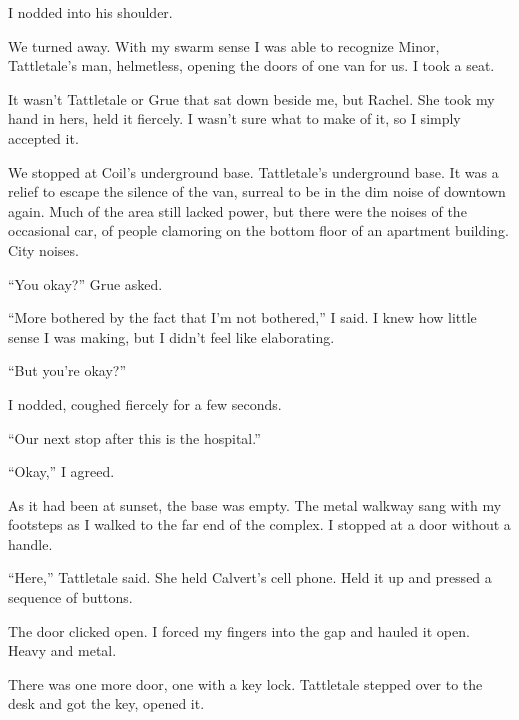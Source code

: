 I nodded into his shoulder.



We turned away.  With my swarm sense I was able to recognize Minor, Tattletale's man, helmetless, opening the doors of one van for us.  I took a seat.



It wasn't Tattletale or Grue that sat down beside me, but Rachel.  She took my hand in hers, held it fiercely.  I wasn't sure what to make of it, so I simply accepted it.



\blacksquare



We stopped at Coil's underground base.  Tattletale's underground base.  It was a relief to escape the silence of the van, surreal to be in the dim noise of downtown again.  Much of the area still lacked power, but there were the noises of the occasional car, of people clamoring on the bottom floor of an apartment building.  City noises.



``You okay?'' Grue asked.



``More bothered by the fact that I'm not bothered,'' I said.  I knew how little sense I was making, but I didn't feel like elaborating.



``But you're okay?''



I nodded, coughed fiercely for a few seconds.



``Our next stop after this is the hospital.''



``Okay,'' I agreed.



As it had been at sunset, the base was empty.  The metal walkway sang with my footsteps as I walked to the far end of the complex.  I stopped at a door without a handle.



``Here,'' Tattletale said.  She held Calvert's cell phone.  Held it up and pressed a sequence of buttons.



The door clicked open.  I forced my fingers into the gap and hauled it open.  Heavy and metal.



There was one more door, one with a key lock.  Tattletale stepped over to the desk and got the key, opened it.



